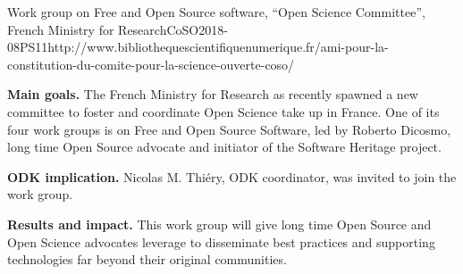 \begin{event}{Work group on Free and Open Source software, ``Open Science Committee'', French Ministry for Research}{CoSO}{2018-08}{PS}{1}{1}{http://www.bibliothequescientifiquenumerique.fr/ami-pour-la-constitution-du-comite-pour-la-science-ouverte-coso/}

\textbf{Main goals.} The French Ministry for Research as recently
spawned a new committee to foster and coordinate Open Science take up
in France. One of its four work groups is on Free and Open Source
Software, led by Roberto Dicosmo, long time Open Source advocate and
initiator of the Software Heritage project.

\textbf{ODK implication.} Nicolas M. Thiéry, ODK coordinator, was
invited to join the work group.

\textbf{Results and impact.} This work group will give long time Open
Source and Open Science advocates leverage to disseminate best
practices and supporting technologies far beyond their original
communities.
\end{event}
